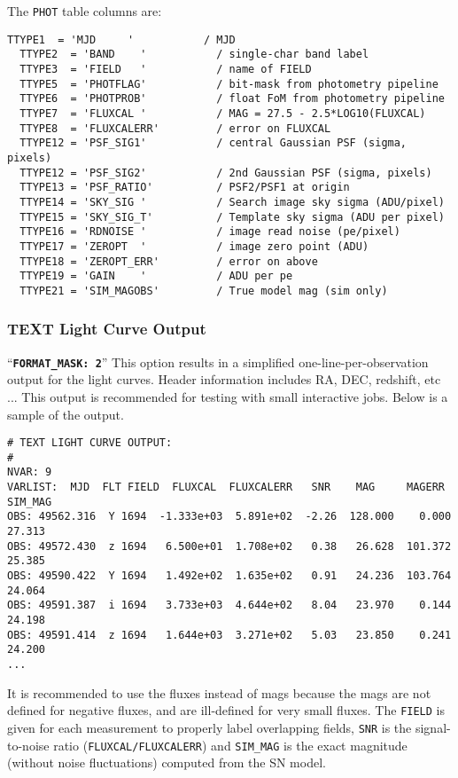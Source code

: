 \documentclass[12pt]{article}
\newcommand{\obs}{observation}
\begin{document}
The {\tt PHOT} table columns are:
\begin{Verbatim}[frame=single]
  TTYPE1  = 'MJD     '           / MJD
  TTYPE2  = 'BAND    '           / single-char band label
  TTYPE3  = 'FIELD   '           / name of FIELD
  TTYPE5  = 'PHOTFLAG'           / bit-mask from photometry pipeline
  TTYPE6  = 'PHOTPROB'           / float FoM from photometry pipeline
  TTYPE7  = 'FLUXCAL '           / MAG = 27.5 - 2.5*LOG10(FLUXCAL)
  TTYPE8  = 'FLUXCALERR'         / error on FLUXCAL  
  TTYPE12 = 'PSF_SIG1'           / central Gaussian PSF (sigma, pixels)
  TTYPE12 = 'PSF_SIG2'           / 2nd Gaussian PSF (sigma, pixels)
  TTYPE13 = 'PSF_RATIO'          / PSF2/PSF1 at origin
  TTYPE14 = 'SKY_SIG '           / Search image sky sigma (ADU/pixel) 
  TTYPE15 = 'SKY_SIG_T'          / Template sky sigma (ADU per pixel)
  TTYPE16 = 'RDNOISE '           / image read noise (pe/pixel)
  TTYPE17 = 'ZEROPT  '           / image zero point (ADU)
  TTYPE18 = 'ZEROPT_ERR'         / error on above
  TTYPE19 = 'GAIN    '           / ADU per pe
  TTYPE21 = 'SIM_MAGOBS'         / True model mag (sim only)
\end{Verbatim}

   \subsubsection{TEXT Light Curve Output }
   \label{sss:text_format}

``{\tt\bf FORMAT\_MASK:  2}'' 
This  option results in a simplified one-line-per-{\obs} 
output for the light curves. Header information includes 
RA, DEC, redshift, etc ...
This output is recommended for testing with small interactive jobs.
Below is a sample of the output.
%
\begin{Verbatim}[frame=single]
# TEXT LIGHT CURVE OUTPUT: 
#
NVAR: 9 
VARLIST:  MJD  FLT FIELD  FLUXCAL  FLUXCALERR   SNR    MAG     MAGERR  SIM_MAG
OBS: 49562.316  Y 1694  -1.333e+03  5.891e+02  -2.26  128.000    0.000  27.313
OBS: 49572.430  z 1694   6.500e+01  1.708e+02   0.38   26.628  101.372  25.385
OBS: 49590.422  Y 1694   1.492e+02  1.635e+02   0.91   24.236  103.764  24.064
OBS: 49591.387  i 1694   3.733e+03  4.644e+02   8.04   23.970    0.144  24.198
OBS: 49591.414  z 1694   1.644e+03  3.271e+02   5.03   23.850    0.241  24.200
...
\end{Verbatim}
%
It is recommended to use the fluxes instead of mags because
the mags are not defined for negative fluxes, and are ill-defined
for very small fluxes.
The {\tt FIELD} is given for each measurement to properly label
overlapping fields, {\tt SNR} is the signal-to-noise ratio
({\tt FLUXCAL/FLUXCALERR}) and  {\tt SIM\_MAG} is the exact 
magnitude (without noise fluctuations) computed from the SN model.
\end{document}
